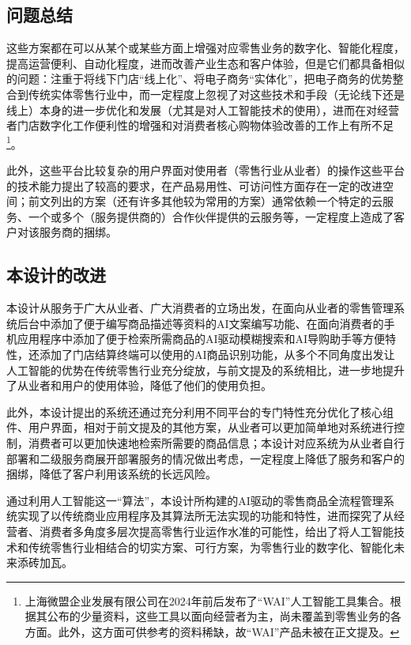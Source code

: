 \subsection{问题总结}

这些方案都在可以从某个或某些方面上增强对应零售业务的数字化、智能化程度，提高运营便利、自动化程度，进而改善产业生态和客户体验，但是它们都具备相似的问题：注重于将线下门店“线上化”、将电子商务“实体化”，把电子商务的优势整合到传统实体零售行业中，而一定程度上忽视了对这些技术和手段（无论线下还是线上）本身的进一步优化和发展（尤其是对人工智能技术的使用），进而在对经营者门店数字化工作便利性的增强和对消费者核心购物体验改善的工作上有所不足\footnote{上海微盟企业发展有限公司在2024年前后发布了“WAI”人工智能工具集合。根据其公布的少量资料，这些工具以面向经营者为主，尚未覆盖到零售业务的各方面。此外，这方面可供参考的资料稀缺，故“WAI”产品未被在正文提及。}。

此外，这些平台比较复杂的用户界面对使用者（零售行业从业者）的操作这些平台的技术能力提出了较高的要求，在产品易用性、可访问性方面存在一定的改进空间；前文列出的方案（还有许多其他较为常用的方案）通常依赖一个特定的云服务、一个或多个（服务提供商的）合作伙伴提供的云服务等，一定程度上造成了客户对该服务商的捆绑。

\subsection{本设计的改进}

本设计从服务于广大从业者、广大消费者的立场出发，在面向从业者的零售管理系统后台中添加了便于编写商品描述等资料的AI文案编写功能、在面向消费者的手机应用程序中添加了便于检索所需商品的AI驱动模糊搜索和AI导购助手等方便特性，还添加了门店结算终端可以使用的AI商品识别功能，从多个不同角度出发让人工智能的优势在传统零售行业充分绽放，与前文提及的系统相比，进一步地提升了从业者和用户的使用体验，降低了他们的使用负担。

此外，本设计提出的系统还通过充分利用不同平台的专门特性充分优化了核心组件、用户界面，相对于前文提及的其他方案，从业者可以更加简单地对系统进行控制，消费者可以更加快速地检索所需要的商品信息；本设计对应系统为从业者自行部署和二级服务商展开部署服务的情况做出考虑，一定程度上降低了服务和客户的捆绑，降低了客户利用该系统的长远风险。

通过利用人工智能这一“算法”，本设计所构建的AI驱动的零售商品全流程管理系统实现了以传统商业应用程序及其算法所无法实现的功能和特性，进而探究了从经营者、消费者多角度多层次提高零售行业运作水准的可能性，给出了将人工智能技术和传统零售行业相结合的切实方案、可行方案，为零售行业的数字化、智能化未来添砖加瓦。